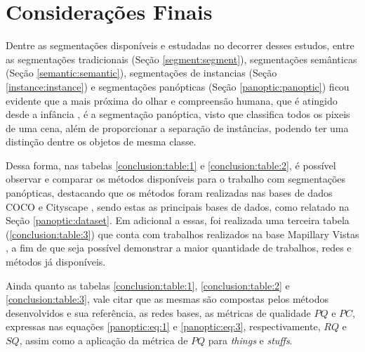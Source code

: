 \newpage
\clearpage
\section{Considerações Finais}
\label{final:final}

Dentre as segmentações disponíveis e estudadas no decorrer desses estudos, entre as segmentações tradicionais (Seção \ref{segment:segment}), segmentações semânticas (Seção \ref{semantic:semantic}), segmentações de instancias (Seção \ref{instance:instance}) e segmentações panópticas (Seção \ref{panoptic:panoptic}) ficou evidente que a mais próxima do olhar e compreensão humana, que é atingido desde a infância \cite{Mohan2020}, é a segmentação panóptica, visto que classifica todos os pixeis de uma cena, além de proporcionar a separação de instâncias, podendo ter uma distinção dentre os objetos de mesma classe.

Dessa forma, nas tabelas \ref{conclusion:table:1} e \ref{conclusion:table:2}, é possível observar e comparar os métodos disponíveis para o trabalho com segmentações panópticas, destacando que os métodos foram realizadas nas bases de dados COCO \cite{Lin2014} e Cityscape \cite{Cordts2016}, sendo estas as principais bases de dados, como relatado na Seção \ref{panoptic:dataset}. Em adicional a essas, foi realizada uma terceira tabela (\ref{conclusion:table:3}) que conta com trabalhos realizados na base Mapillary Vistas \cite{Neuhold2017_ICCV}, a fim de que seja possível demonstrar a maior quantidade de trabalhos, redes e métodos já disponíveis.

Ainda quanto as tabelas \ref{conclusion:table:1}, \ref{conclusion:table:2} e \ref{conclusion:table:3}, vale citar que as mesmas são compostas pelos métodos desenvolvidos e sua referência, as redes bases, as métricas de qualidade $PQ$ e $PC$, expressas nas equações \ref{panoptic:eq:1} e \ref{panoptic:eq:3}, respectivamente, $RQ$ e $SQ$, assim como a aplicação da métrica de $PQ$ para \textit{things} e \textit{stuffs}.

